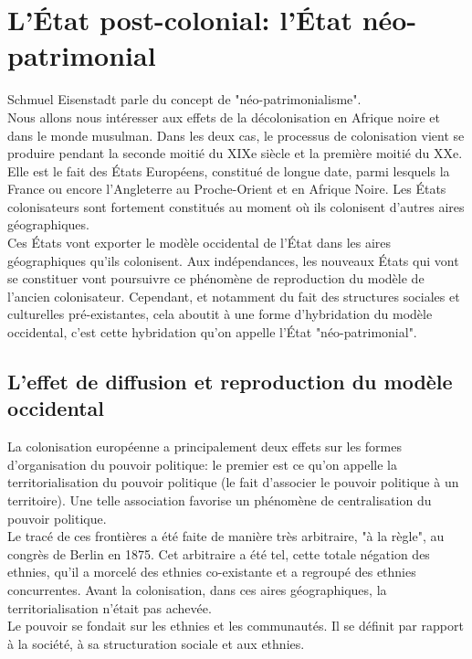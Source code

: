 \documentclass[10pt, a4paper, openany]{book}
\begin{document}
\section{L'État post-colonial: l'État néo-patrimonial}

Schmuel Eisenstadt parle du concept de "néo-patrimonialisme". \\
Nous allons nous intéresser aux effets de la décolonisation en Afrique noire et dans le monde musulman. Dans les deux cas, le processus de colonisation vient se produire pendant la seconde moitié du XIXe siècle et la première moitié du XXe. Elle est le fait des États Européens, constitué de longue date, parmi lesquels la France ou encore l'Angleterre au Proche-Orient et en Afrique Noire. Les États colonisateurs sont fortement constitués au moment où ils colonisent d'autres aires géographiques. \\
Ces États vont exporter le modèle occidental de l'État dans les aires géographiques qu'ils colonisent. Aux indépendances, les nouveaux États qui vont se constituer vont poursuivre ce phénomène de reproduction du modèle de l'ancien colonisateur. Cependant, et notamment du fait des structures sociales et culturelles pré-existantes, cela aboutit à une forme d'hybridation du modèle occidental, c'est cette hybridation qu'on appelle l'État "néo-patrimonial". 


\subsection{L'effet de diffusion et reproduction du modèle occidental}

La colonisation européenne a principalement deux effets sur les formes d'organisation du pouvoir politique: le premier est ce qu'on appelle la territorialisation du pouvoir politique (le fait d'associer le pouvoir politique à un territoire). Une telle association favorise un phénomène de centralisation du pouvoir politique. \\
Le tracé de ces frontières a été faite de manière très arbitraire, "à la règle", au congrès de Berlin en 1875. Cet arbitraire a été tel, cette totale négation des ethnies, qu'il a morcelé des ethnies co-existante et a regroupé des ethnies concurrentes. Avant la colonisation, dans ces aires géographiques, la territorialisation n'était pas achevée. \\
Le pouvoir se fondait sur les ethnies et les communautés. Il se définit par rapport à la société, à sa structuration sociale et aux ethnies. 
\end{document}
